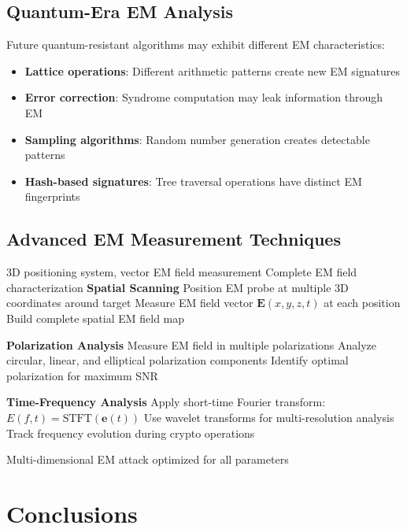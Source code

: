 \documentclass[11pt,a4paper]{article}
\theoremstyle{definition}
\begin{document}
\subsection{Quantum-Era EM Analysis}

Future quantum-resistant algorithms may exhibit different EM characteristics:

\begin{itemize}
    \item \textbf{Lattice operations}: Different arithmetic patterns create new EM signatures
    \item \textbf{Error correction}: Syndrome computation may leak information through EM
    \item \textbf{Sampling algorithms}: Random number generation creates detectable patterns
    \item \textbf{Hash-based signatures}: Tree traversal operations have distinct EM fingerprints
\end{itemize}

\subsection{Advanced EM Measurement Techniques}

\begin{algorithm}
\caption{Multi-Dimensional EM Analysis}
\begin{algorithmic}[1]
\REQUIRE 3D positioning system, vector EM field measurement
\ENSURE Complete EM field characterization
\STATE \textbf{Spatial Scanning}
\STATE Position EM probe at multiple 3D coordinates around target
\STATE Measure EM field vector $\mathbf{E}(x,y,z,t)$ at each position
\STATE Build complete spatial EM field map

\STATE \textbf{Polarization Analysis}
\STATE Measure EM field in multiple polarizations
\STATE Analyze circular, linear, and elliptical polarization components
\STATE Identify optimal polarization for maximum SNR

\STATE \textbf{Time-Frequency Analysis}
\STATE Apply short-time Fourier transform: $E(f,t) = \text{STFT}(\mathbf{e}(t))$
\STATE Use wavelet transforms for multi-resolution analysis
\STATE Track frequency evolution during crypto operations

\RETURN Multi-dimensional EM attack optimized for all parameters
\end{algorithmic}
\end{algorithm}

\section{Conclusions}
\end{document}

